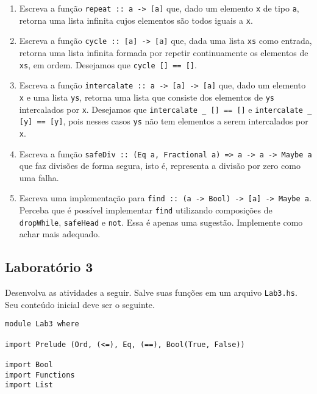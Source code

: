 \documentclass[a4paper]{article}
\begin{document}
\begin{enumerate}
	\item
		Escreva a função \texttt{repeat :: a -> [a]} que, dado um elemento \texttt{x} de tipo \texttt{a}, retorna uma lista infinita cujos elementos são todos iguais a \texttt{x}.
	\item
		Escreva a função \texttt{cycle :: [a] -> [a]} que, dada uma lista \texttt{xs} como entrada, retorna uma lista infinita formada por repetir continuamente os elementos de \texttt{xs}, em ordem.
		Desejamos que \texttt{cycle [] == []}.
	\item
		Escreva a função \texttt{intercalate :: a -> [a] -> [a]} que, dado um elemento \texttt{x} e uma lista \texttt{ys}, retorna uma lista que consiste dos elementos de \texttt{ys} intercalados por \texttt{x}.
		Desejamos que \texttt{intercalate \_ [] == []} e \texttt{intercalate \_ [y] == [y]}, pois nesses casos \texttt{ys} não tem elementos a serem intercalados por \texttt{x}.
	\item
		Escreva a função \texttt{safeDiv :: (Eq a, Fractional a) => a -> a -> Maybe a} que faz divisões de forma segura, isto é, representa a divisão por zero como uma falha.
	\item
		Escreva uma implementação para \texttt{find :: (a -> Bool) -> [a] -> Maybe a}.
		Perceba que é possível implementar \texttt{find} utilizando composições de \texttt{dropWhile}, \texttt{safeHead} e \texttt{not}.
		Essa é apenas uma sugestão. Implemente como achar mais adequado.
\end{enumerate}

\subsection{Laboratório 3}	\label{lab3}

Desenvolva as atividades a seguir.
Salve suas funções em um arquivo \texttt{Lab3.hs}.
Seu conteúdo inicial deve ser o seguinte.

\begin{verbatim}
module Lab3 where

import Prelude (Ord, (<=), Eq, (==), Bool(True, False))

import Bool
import Functions
import List
\end{verbatim}
\end{document}
